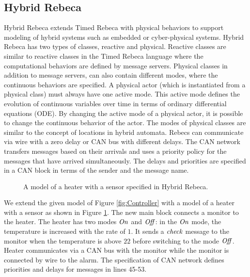 \subsection{Hybrid Rebeca}
Hybrid Rebeca extends Timed Rebeca with physical behaviors to support modeling of hybrid systems such as embedded or cyber-physical systems. Hybrid Rebeca has two types of classes, reactive and physical. Reactive classes are similar to reactive classes in the Timed Rebeca language where the computational behaviors are defined by message servers. Physical classes in addition to message servers, can also contain different modes, where the continuous behaviors are specified. A physical actor (which is instantiated from a physical class) must always have one active mode. This active mode defines the evolution of continuous variables over time in terms of ordinary differential equations (ODE). By changing the active mode of a physical actor, it is possible to change the continuous behavior of the actor.  The modes of physical classes are similar to the concept of locations in hybrid automata. Rebecs can communicate via wire with a zero delay or CAN bus with different delays. The CAN network transfers messages based on their arrivals and uses a priority policy for the messages that have arrived simultaneously. The delays and priorities are specified in a CAN block in terms of the sender and the message name.

\begin{figure}[h]
	\centering
	
	\caption{A model of a heater with a sensor specified in Hybrid Rebeca.}
	\label{fig:sensor}
\end{figure}

\begin{example}
We extend the given model of Figure \ref{fig:Controller} with a model of a heater with a sensor as shown in Figure \ref{fig:sensor}. The new main block connects a monitor to the heater. The heater has two modes $\it On$ and $\it Off$: in the $\it On$ mode, the temperature is increased with the rate of $1$. It sends a $\it check$ message to the monitor when the temperature is above $22$ before switching to the mode $\it Off$. Heater communicates via a CAN bus with the monitor while the monitor is connected by wire to the alarm. The specification of CAN network defines priorities and delays for messages in lines 45-53. 
\end{example}

